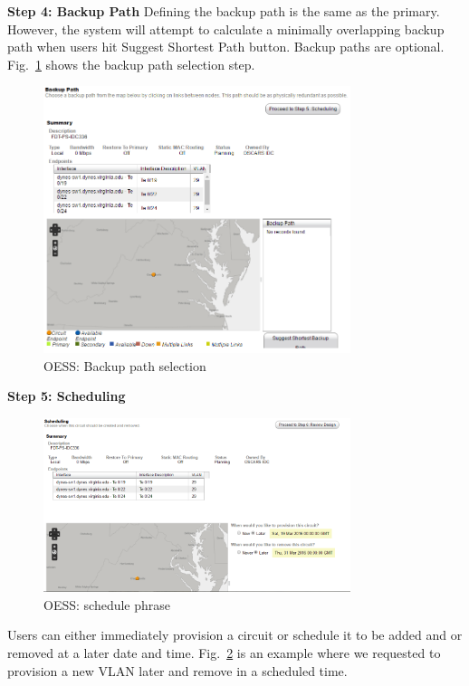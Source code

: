 {\textbf{Step 4: Backup Path}
Defining the backup path is the same as the primary. However, the system will attempt to calculate a minimally overlapping backup path when users hit Suggest Shortest Path button.  Backup paths are optional. Fig.~\ref{fig:oessbackup} shows the backup path selection step.
\begin{figure}[htb!]
\centering
\includegraphics[width=0.8\textwidth]{figures/oess-backup.png}
\caption{OESS: Backup path selection}
\label{fig:oessbackup}
\end{figure}

\textbf{Step 5: Scheduling}
\begin{figure}[htb!]
\centering
\includegraphics[width=0.8\textwidth]{figures/oess-schedule.png}
\caption{OESS: schedule phrase}
\label{fig:oessschedule}
\end{figure}
Users can either immediately provision a circuit or schedule it to be added and or removed at a later date and time.
Fig.~\ref{fig:oessschedule} is an example where we requested to provision a new VLAN later and remove in a scheduled time. 

}
